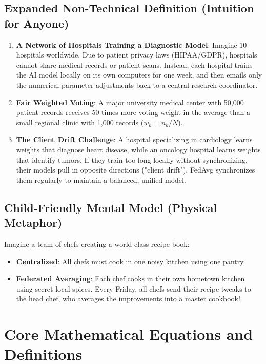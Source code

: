 \documentclass[11pt,a4paper]{article}
\theoremstyle{definition}
\begin{document}
\subsection{Expanded Non-Technical Definition (Intuition for Anyone)}
\begin{enumerate}
    \item \textbf{A Network of Hospitals Training a Diagnostic Model}: Imagine 10 hospitals worldwide. Due to patient privacy laws (HIPAA/GDPR), hospitals cannot share medical records or patient scans. Instead, each hospital trains the AI model locally on its own computers for one week, and then emails only the numerical parameter adjustments back to a central research coordinator.
    \item \textbf{Fair Weighted Voting}: A major university medical center with 50,000 patient records receives 50 times more voting weight in the average than a small regional clinic with 1,000 records ($w_k = n_k / N$).
    \item \textbf{The Client Drift Challenge}: A hospital specializing in cardiology learns weights that diagnose heart disease, while an oncology hospital learns weights that identify tumors. If they train too long locally without synchronizing, their models pull in opposite directions ("client drift"). FedAvg synchronizes them regularly to maintain a balanced, unified model.
\end{enumerate}

\subsection{Child-Friendly Mental Model (Physical Metaphor)}
Imagine a team of chefs creating a world-class recipe book:
\begin{itemize}
    \item \textbf{Centralized}: All chefs must cook in one noisy kitchen using one pantry.
    \item \textbf{Federated Averaging}: Each chef cooks in their own hometown kitchen using secret local spices. Every Friday, all chefs send their recipe tweaks to the head chef, who averages the improvements into a master cookbook!
\end{itemize}

\section{Core Mathematical Equations and Definitions}
\end{document}
